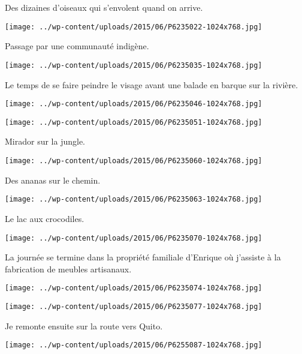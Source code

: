 Des dizaines d'oiseaux qui s'envolent quand on arrive. 
\begin{center} 
\texttt{[image: ../wp-content/uploads/2015/06/P6235022-1024x768.jpg]} 
\end{center}

Passage par une communauté indigène. 
\begin{center} 
\texttt{[image: ../wp-content/uploads/2015/06/P6235035-1024x768.jpg]} 
\end{center}
\pagebreak

Le temps de se faire peindre le visage avant une balade en barque sur la rivière. 
\begin{center} 
\texttt{[image: ../wp-content/uploads/2015/06/P6235046-1024x768.jpg]} 
\end{center}
\begin{center} 
\texttt{[image: ../wp-content/uploads/2015/06/P6235051-1024x768.jpg]} 
\end{center}

\pagebreak
Mirador sur la jungle. 
\begin{center} 
\texttt{[image: ../wp-content/uploads/2015/06/P6235060-1024x768.jpg]} 
\end{center}

Des ananas sur le chemin. 
\begin{center} 
\texttt{[image: ../wp-content/uploads/2015/06/P6235063-1024x768.jpg]} 
\end{center}
\pagebreak

Le lac aux crocodiles. 
\begin{center} 
\texttt{[image: ../wp-content/uploads/2015/06/P6235070-1024x768.jpg]} 
\end{center}

La journée se termine dans la propriété familiale d'Enrique où j'assiste à la fabrication de meubles artisanaux. 
\begin{center} 
\texttt{[image: ../wp-content/uploads/2015/06/P6235074-1024x768.jpg]} 
\end{center}
\begin{center} 
\texttt{[image: ../wp-content/uploads/2015/06/P6235077-1024x768.jpg]} 
\end{center}

Je remonte ensuite sur la route vers Quito. 
\begin{center} 
\texttt{[image: ../wp-content/uploads/2015/06/P6255087-1024x768.jpg]} 
\end{center}
\pagebreak

